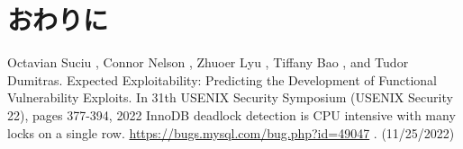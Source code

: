 \documentclass[submit,techreq,noauthor]{eco}	%
\begin{document}
\section{おわりに}


\begin{thebibliography}{99}
   Octavian Suciu , Connor Nelson , Zhuoer Lyu , Tiffany Bao , and Tudor Dumitras.
    \quad Expected Exploitability: Predicting the Development of Functional Vulnerability 
    Exploits. In 31th USENIX Security Symposium (USENIX Security 22), pages 377-394, 2022
  InnoDB deadlock detection is CPU intensive with many locks on a single row.
    \url{https://bugs.mysql.com/bug.php?id=49047} . (11/25/2022)
\end{thebibliography}
\end{document}
